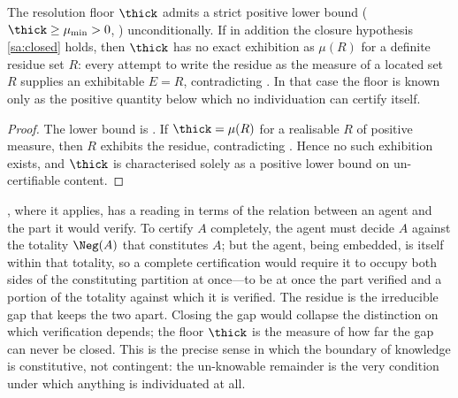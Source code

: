 \begin{corollary}
\label{cor:floor-only-bounded}
The resolution floor $\thick$ admits a strict positive lower bound
\textup{(}$\thick\ge\mu_{\min}>0$, \textup{)}
unconditionally. If in addition the closure hypothesis \ref{sa:closed} holds,
then $\thick$ has no exact exhibition as $\mu(R)$ for a definite residue set $R$:
every attempt to write the residue as the measure of a located set $R$ supplies
an exhibitable $E=R$, contradicting . In that case
the floor is known only as the positive quantity below which no individuation can
certify itself.
\end{corollary}

\begin{proof}
The lower bound is . If $\thick=\mu(R)$ for a realisable $R$
of positive measure, then $R$ exhibits the residue, contradicting
. Hence no such exhibition exists, and $\thick$ is
characterised solely as a positive lower bound on un-certifiable content.
\end{proof}

\begin{remark}
\label{rem:recognition-gap}
, where it applies, has a reading in terms of the
relation between an agent and the part it would verify. To certify $A$ completely, the agent must
decide $A$ against the totality $\Neg(A)$ that constitutes $A$; but the agent,
being embedded, is itself within that totality, so a complete certification would
require it to occupy both sides of the constituting partition at once---to be at
once the part verified and a portion of the totality against which it is
verified. The residue is the irreducible gap that keeps the two apart. Closing
the gap would collapse the distinction on which verification depends; the floor
$\thick$ is the measure of how far the gap can never be closed. This is the
precise sense in which the boundary of knowledge is constitutive, not contingent:
the un-knowable remainder is the very condition under which anything is
individuated at all.
\end{remark}
